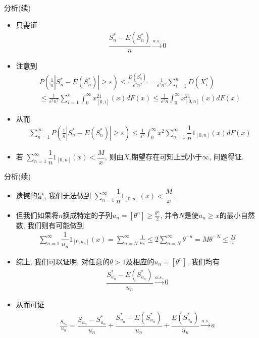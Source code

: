 \begin{frame}{分析(续)}
	\begin{itemize}[<+-|alert@+>]
	\item 只需证
	\begin{align*}
		\dfrac{S_n^*-E(S_n^*)}{n}\stackrel{a.s.}{\rightarrow}  0
	\end{align*}
    \item 注意到
	\begin{align*}
		&P\left(\frac{1}n\left|S_n^{*}-E\left(S_n^{*}\right)\right| \geq \varepsilon\right) \leq \frac{D(S_n^*)}{\varepsilon^{2}n^2}= \frac{1}{\varepsilon^{2}n^2}\sum_{i=1}^nD(X_i^*)\\
		&\leq  \frac{1}{\varepsilon^{2}n^2}\sum_{i=1}^n \int_{0}^{\infty}x^21_{[0,i]}(x) d F(x)\leq \frac{1}{\varepsilon^{2}n} \int_{0}^{\infty}x^21_{[0,n]}(x) d F(x)
	\end{align*}
    \item 从而
	\begin{align*}
		&\sum_{n=1}^\infty P\left(\frac{1}n\left|S_n^{*}-E\left(S_n^{*}\right)\right| \geq \varepsilon\right) \leq \frac{1}{\varepsilon^{2}} \int_{0}^{\infty}x^2\sum_{n=1}^\infty \dfrac{1}{n}1_{[0,n]}(x) d F(x)
	\end{align*}
	\item 若 $\sum_{n=1}^\infty \dfrac{1}{n}1_{[0,n]}(x)<\dfrac{M}{x}$, 则由$X_i$期望存在可知上式小于$\infty$, 问题得证.
	\end{itemize}


\end{frame}

\begin{frame}{分析(续)}
	\begin{itemize}[<+-|alert@+>]
	\item  遗憾的是, 我们无法做到 $\sum_{n=1}^\infty \dfrac{1}{n}1_{[0,n]}(x)<\dfrac{M}{x}$.
	\item 但我们如果将$n$换成特定的子列$u_n=[\theta^n]\geq \frac{\theta^n}{2}$, 并令$N$是使$u_{n} \geq x$的最小自然数, 我们则有可能做到
	\begin{align*}
		\sum_{n=1}^\infty \dfrac{1}{u_n}1_{[0,u_n]}(x)=\sum_{n=N}^{\infty} \frac{1}{u_{n}}\leq 2 \sum_{n=N}^{\infty} \theta^{-n}=M \theta^{-N} \leq \frac{M}{x}
	\end{align*}

	\item 综上, 我们可以证明, 对任意的$\theta>1$及相应的$u_n=[\theta^n]$, 我们均有
	\begin{align*}
		\dfrac{S_{u_n}^*-E(S_{u_n}^*)}{u_n}\stackrel{a.s.}{\rightarrow}  0
	\end{align*}
	\item 从而可证
	\begin{align*}
		\frac{S_{u_{n}}}{u_{n}}  =\dfrac{S_{u_n}-S_{u_n}^*}{u_n}+\dfrac{S_{u_n}^*-E(S_{u_n}^*)}{u_n}+\dfrac{E(S_{u_n}^*)}{u_n}\stackrel{a.s.}{\rightarrow} a
	\end{align*}

	\end{itemize}


\end{frame}



